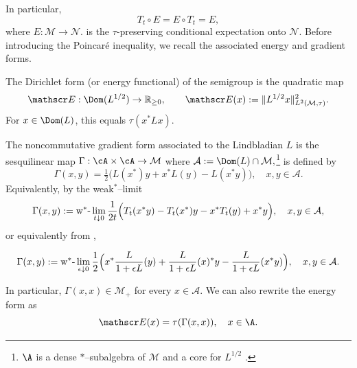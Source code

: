 \documentclass[sn-mathphys-num]{sn-jnl}
\begin{document}
In particular,
\[
T_t \circ E = E \circ T_t = E,
\]
where
$
E : \mathcal{M} \to \mathcal{N}.
$
is the $\tau$-preserving conditional expectation onto $\mathcal{N}$.
Before introducing the Poincar\'e inequality, we recall the associated energy and gradient forms.
\begin{definition}\label{def:DirichletForm}
The Dirichlet form (or energy functional) of the semigroup is the quadratic map
\[
\mathscr E:\Dom(L^{1/2})\to\mathbb R_{\ge0},
\qquad
\mathscr E(x):=\|L^{1/2}x\|_{L^2(\mathcal M,\tau)}^2.
\]
For $x\in\Dom(L)$, this equals $\tau(x^*Lx)$.
\end{definition}
\begin{definition}\label{def:Gamma}
The noncommutative gradient form associated to the Lindbladian $L$ is the sesquilinear map $\Gamma: \cA \times \cA \to \mathcal{M}$ where $
\mathcal{A}
:=
\Dom(L)\cap\mathcal{M},
$\footnote{$\A$ is a dense $*$--subalgebra of $\mathcal{M}$ and a core for $L^{1/2}$ \cite{cipriani_derivations_2003, davies_non-commutative_1992}.}
is defined by \cite[Section~2.1]{gao_fisher_2020} \[
\Gamma(x,y)
 =
\tfrac12\bigl(L(x^*)  y  +  x^*  L(y) - L(x^*y)\bigr),
\quad
  x,y\in\mathcal{A}.
\]
Equivalently, by the weak$^*$--limit
\begin{equation}\label{eq:Gamma}
    \Gamma(x,y)
 :=
\mathrm{w}^*\text{-}   \lim_{t\downarrow0}
\frac{1}{2t}\Bigl(
T_t(x^*y)
 -
T_t(x^*)  y
 -
x^*  T_t(y)+x^*y
\Bigr),
\quad
 x,y\in\mathcal{A},
\end{equation}
or equivalently from \cite[Lemma~9.1]{cipriani_derivations_2003},

\begin{equation}\label{eq:Gamma-epsilon}
    \Gamma(x,y)
 :=
\mathrm{w}^*\text{-}   \lim_{\epsilon\downarrow0}
\frac{1}{2}\Bigl(
x^*\frac{L}{1+\epsilon L}(y)+\frac{L}{1+\epsilon L}(x)^*y-\frac{L}{1+\epsilon L}(x^*y)
\Bigr),
\quad
  x,y\in\mathcal{A}.
\end{equation}

In particular, $\Gamma(x,x)\in\mathcal{M}_+$ for every $x\in\mathcal{A}$. We can also rewrite the energy form as
\[
\mathscr E(x) = \tau(\Gamma(x, x)),\quad x\in\A.
\]

\end{definition}
\end{document}
